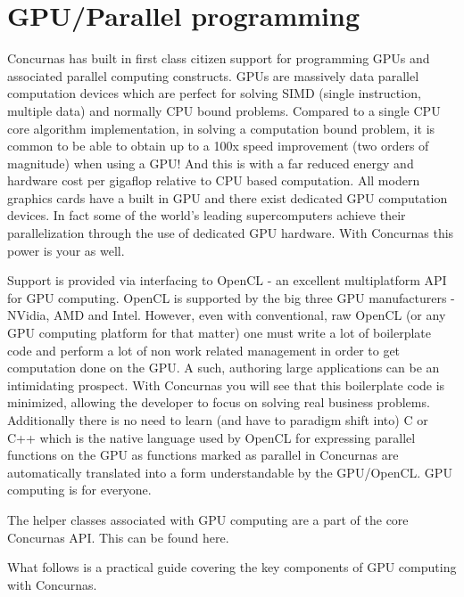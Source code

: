 \documentclass[conc-doc]{subfiles}
\begin{document}
	
	\chapter[GPU/Parallel programming]{GPU/Parallel programming}
	\label{ch:gpuprogramming}



Concurnas has built in first class citizen support for programming GPUs and associated parallel computing constructs. GPUs are massively data parallel computation devices which are perfect for solving SIMD (single instruction, multiple data) and normally CPU bound problems. Compared to a single CPU core algorithm implementation, in solving a computation bound problem, it is common to be able to obtain up to a 100x speed improvement (two orders of magnitude) when using a GPU! And this is with a far reduced energy and hardware cost per gigaflop relative to CPU based computation. All modern graphics cards have a built in GPU and there exist dedicated GPU computation devices. In fact some of the world's leading supercomputers achieve their parallelization through the use of dedicated GPU hardware. With Concurnas this power is your as well.

Support is provided via interfacing to OpenCL - an excellent multiplatform API for GPU computing. OpenCL is supported by the big three GPU manufacturers - NVidia, AMD and Intel. However, even with conventional, raw OpenCL (or any GPU computing platform for that matter) one must write a lot of boilerplate code and perform a lot of non work related management in order to get computation done on the GPU. A such, authoring large applications can be an intimidating prospect. With Concurnas you will see that this boilerplate code is minimized, allowing the developer to focus on solving real business problems. Additionally there is no need to learn (and have to paradigm shift into) C or C++ which is the native language used by OpenCL for expressing parallel functions on the GPU as functions marked as parallel in Concurnas are automatically translated into a form understandable by the GPU/OpenCL. GPU computing is for everyone.

The helper classes associated with GPU computing are a part of the core Concurnas API. This can be found here.

What follows is a practical guide covering the key components of GPU computing with Concurnas.
\end{document}
